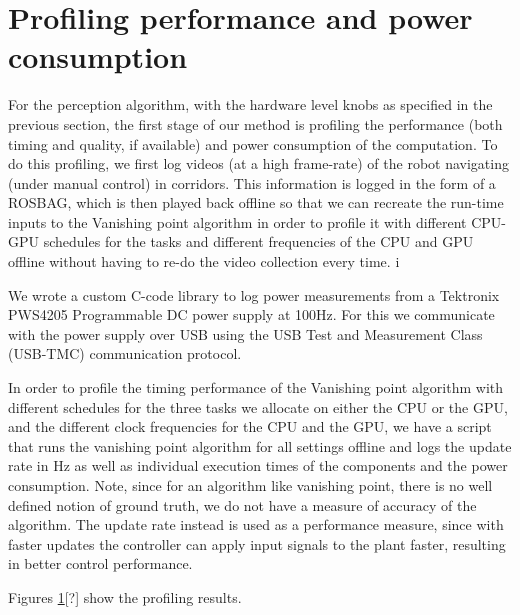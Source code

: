 \section{Profiling performance and power consumption}

For the perception algorithm, with the hardware level knobs as specified in the previous section, the first stage of our method is profiling the performance (both timing and quality, if available) and power consumption of the computation. To do this profiling, we first log videos (at a high frame-rate) of the robot navigating (under manual control) in corridors. This information is logged in the form of a ROSBAG, which is then played back offline so that we can recreate the run-time inputs to the Vanishing point algorithm in order to profile it with different CPU-GPU schedules for the tasks and different frequencies of the CPU and GPU offline without having to re-do the video collection every time. i

We wrote a custom C-code library to log power measurements from a Tektronix PWS4205 Programmable DC power supply at 100Hz. For this we communicate with the power supply over USB using the USB Test and Measurement Class (USB-TMC) communication protocol. 

In order to profile the timing performance of the Vanishing point algorithm with different schedules for the three tasks we allocate on either the CPU or the GPU, and the different clock frequencies for the CPU and the GPU, we have a script that runs the vanishing point algorithm for all settings offline and logs the update rate in Hz as well as individual execution times of the components and the power consumption. Note, since for an algorithm like vanishing point, there is no well defined notion of ground truth, we do not have a measure of accuracy of the algorithm. The update rate instead is used as a performance measure, since with faster updates the controller can apply input signals to the plant faster, resulting in better control performance. 

Figures \ref{}[?] show the profiling results.
